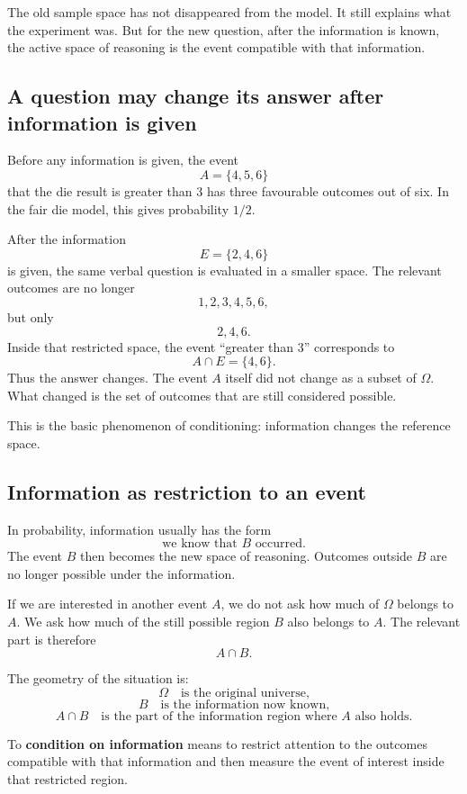 \begin{remarkbox}
The old sample space has not disappeared from the model. It still explains what
the experiment was. But for the new question, after the information is known,
the active space of reasoning is the event compatible with that information.
\end{remarkbox}

\subsection*{A question may change its answer after information is given}

Before any information is given, the event
\[
A=\{4,5,6\}
\]
that the die result is greater than \(3\) has three favourable outcomes out of
six. In the fair die model, this gives probability \(1/2\).

After the information
\[
E=\{2,4,6\}
\]
is given, the same verbal question is evaluated in a smaller space. The relevant
outcomes are no longer
\[
1,2,3,4,5,6,
\]
but only
\[
2,4,6.
\]
Inside that restricted space, the event ``greater than \(3\)'' corresponds to
\[
A\cap E=\{4,6\}.
\]
Thus the answer changes. The event \(A\) itself did not change as a subset of
\(\Omega\). What changed is the set of outcomes that are still considered
possible.

This is the basic phenomenon of conditioning: information changes the reference
space.

\subsection*{Information as restriction to an event}

In probability, information usually has the form
\[
\text{we know that }B\text{ occurred.}
\]
The event \(B\) then becomes the new space of reasoning. Outcomes outside
\(B\) are no longer possible under the information.

If we are interested in another event \(A\), we do not ask how much of
\(\Omega\) belongs to \(A\). We ask how much of the still possible region \(B\)
also belongs to \(A\). The relevant part is therefore
\[
A\cap B.
\]

The geometry of the situation is:
\[
\Omega \quad\text{is the original universe,}
\]
\[
B \quad\text{is the information now known,}
\]
\[
A\cap B \quad\text{is the part of the information region where }A\text{ also holds.}
\]

\begin{definitionbox}
To \textbf{condition on information} means to restrict attention to the outcomes
compatible with that information and then measure the event of interest inside
that restricted region.
\end{definitionbox}

